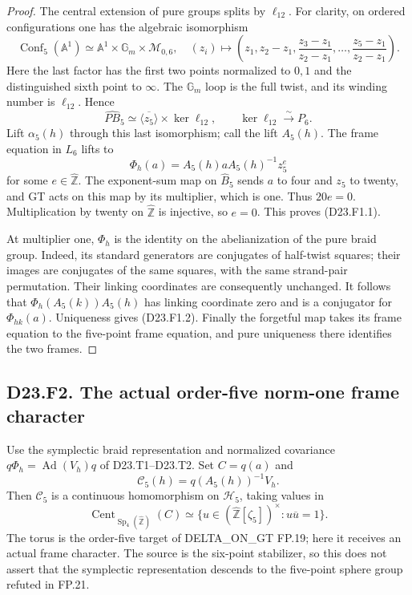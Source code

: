 \begin{proof}
The central extension of pure groups splits by $\ell_{12}$.
For clarity, on ordered configurations one has the algebraic
isomorphism
\[
 \operatorname{Conf}_5(\mathbb A^1)
 \simeq\mathbb A^1\times\mathbb G_m\times\mathcal M_{0,6},
\quad
 (z_i)\longmapsto
 \left(z_1,z_2-z_1,
       \frac{z_3-z_1}{z_2-z_1},\ldots,
       \frac{z_5-z_1}{z_2-z_1}\right).
\]
Here the last factor has the first two points normalized to $0,1$
and the distinguished sixth point to $\infty$.
The $\mathbb G_m$ loop is the full twist, and its winding number
is $\ell_{12}$.  Hence
\[
 \widehat{PB}_5\simeq
 \overline{\langle z_5\rangle}\times\ker\ell_{12},
 \qquad \ker\ell_{12}\xrightarrow{\sim}P_6.
\]
Lift $\alpha_5(h)$ through this last isomorphism; call the lift
$A_5(h)$.  The frame equation in $L_6$ lifts to
\[
 \Phi_h(a)=A_5(h)aA_5(h)^{-1}z_5^e
\]
for some $e\in\widehat{\mathbb Z}$.  The exponent-sum map on
$\widehat B_5$ sends $a$ to four and $z_5$ to twenty, and GT
acts on this map by its multiplier, which is one.  Thus $20e=0$.
Multiplication by twenty on $\widehat{\mathbb Z}$ is injective,
so $e=0$.  This proves (D23.F1.1).

At multiplier one, $\Phi_h$ is the identity on the abelianization
of the pure braid group.  Indeed, its standard generators are
conjugates of half-twist squares; their images are conjugates
of the same squares, with the same strand-pair permutation.
Their linking coordinates are consequently unchanged.
It follows that $\Phi_h(A_5(k))A_5(h)$ has linking coordinate
zero and is a conjugator for $\Phi_{hk}(a)$.  Uniqueness gives
(D23.F1.2).  Finally the forgetful map takes its frame equation
to the five-point frame equation, and pure uniqueness there
identifies the two frames.
\end{proof}

\subsection*{D23.F2. The actual order-five norm-one frame character}
Use the symplectic braid representation and normalized covariance
$q\Phi_h=\operatorname{Ad}(V_h)q$ of D23.T1--D23.T2.
Set $C=q(a)$ and
\[
 \mathcal C_5(h)=q(A_5(h))^{-1}V_h.
 \tag{D23.F2.1}
\]
Then $\mathcal C_5$ is a continuous homomorphism on
$\mathcal H_5$, taking values in
\[
 \operatorname{Cent}_{\operatorname{Sp}_4(\widehat{\mathbb Z})}(C)
  \simeq
 \{u\in(\widehat{\mathbb Z}[\zeta_5])^\times:
                    u\overline u=1\}.
 \tag{D23.F2.2}
\]
The torus is the order-five target of DELTA\_ON\_GT FP.19;
here it receives an actual frame character.  The source is the
six-point stabilizer, so this does not assert that the
symplectic representation descends to the five-point sphere
group refuted in FP.21.

